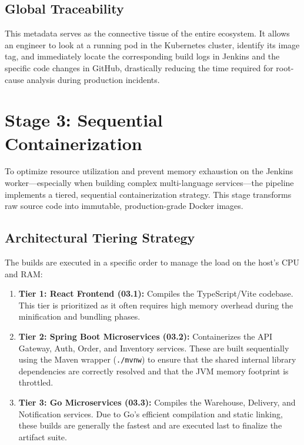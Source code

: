 \documentclass[12pt,a4paper]{report}
\begin{document}
\subsection{Global Traceability}
This metadata serves as the connective tissue of the entire ecosystem. It allows an engineer to look at a running pod in the Kubernetes cluster, identify its image tag, and immediately locate the corresponding build logs in Jenkins and the specific code changes in GitHub, drastically reducing the time required for root-cause analysis during production incidents.

\section{Stage 3: Sequential Containerization}
To optimize resource utilization and prevent memory exhaustion on the Jenkins worker---especially when building complex multi-language services---the pipeline implements a tiered, sequential containerization strategy. This stage transforms raw source code into immutable, production-grade Docker images.

\subsection{Architectural Tiering Strategy}
The builds are executed in a specific order to manage the load on the host's CPU and RAM:
\begin{enumerate}
    \item \textbf{Tier 1: React Frontend (03.1):} Compiles the TypeScript/Vite codebase. This tier is prioritized as it often requires high memory overhead during the minification and bundling phases.
    \item \textbf{Tier 2: Spring Boot Microservices (03.2):} Containerizes the API Gateway, Auth, Order, and Inventory services. These are built sequentially using the Maven wrapper (\texttt{./mvnw}) to ensure that the shared internal library dependencies are correctly resolved and that the JVM memory footprint is throttled.
    \item \textbf{Tier 3: Go Microservices (03.3):} Compiles the Warehouse, Delivery, and Notification services. Due to Go's efficient compilation and static linking, these builds are generally the fastest and are executed last to finalize the artifact suite.
\end{enumerate}
\end{document}
